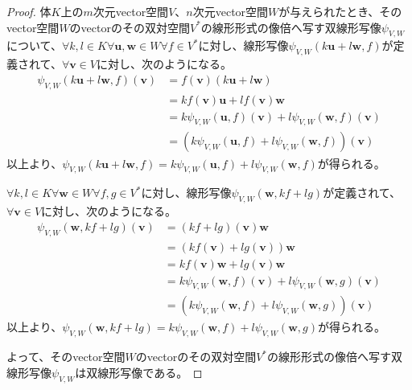 \documentclass[dvipdfmx]{jsarticle}
\begin{document}
\begin{proof}
体$K$上の$m$次元vector空間$V$、$n$次元vector空間$W$が与えられたとき、そのvector空間$W$のvectorのその双対空間$V^{*}$の線形形式の像倍へ写す双線形写像$\psi_{V,W}$について、$\forall k,l \in K\forall\mathbf{u},\mathbf{w} \in W\forall f \in V^{*}$に対し、線形写像$\psi_{V,W}\left( k\mathbf{u} + l\mathbf{w},f \right)$が定義されて、$\forall\mathbf{v} \in V$に対し、次のようになる。
\begin{align*}
\psi_{V,W}\left( k\mathbf{u} + l\mathbf{w},f \right)\left( \mathbf{v} \right) &= f\left( \mathbf{v} \right)\left( k\mathbf{u} + l\mathbf{w} \right)\\
&= kf\left( \mathbf{v} \right)\mathbf{u} + lf\left( \mathbf{v} \right)\mathbf{w}\\
& = k\psi_{V,W}\left( \mathbf{u},f \right)\left( \mathbf{v} \right) + l\psi_{V,W}\left( \mathbf{w},f \right)\left( \mathbf{v} \right)\\
& = \left( k\psi_{V,W}\left( \mathbf{u},f \right) + l\psi_{V,W}\left( \mathbf{w},f \right) \right)\left( \mathbf{v} \right)
\end{align*}
以上より、$\psi_{V,W}\left( k\mathbf{u} + l\mathbf{w},f \right) = k\psi_{V,W}\left( \mathbf{u},f \right) + l\psi_{V,W}\left( \mathbf{w},f \right)$が得られる。\par
$\forall k,l \in K\forall\mathbf{w} \in W\forall f,g \in V^{*}$に対し、線形写像$\psi_{V,W}\left( \mathbf{w},kf + lg \right)$が定義されて、$\forall\mathbf{v} \in V$に対し、次のようになる。
\begin{align*}
\psi_{V,W}\left( \mathbf{w},kf + lg \right)\left( \mathbf{v} \right) &= (kf + lg)\left( \mathbf{v} \right)\mathbf{w}\\
&= \left( kf\left( \mathbf{v} \right) + lg\left( \mathbf{v} \right) \right)\mathbf{w}\\
&= kf\left( \mathbf{v} \right)\mathbf{w} + lg\left( \mathbf{v} \right)\mathbf{w}\\
&= k\psi_{V,W}\left( \mathbf{w},f \right)\left( \mathbf{v} \right) + l\psi_{V,W}\left( \mathbf{w},g \right)\left( \mathbf{v} \right)\\
&= \left( k\psi_{V,W}\left( \mathbf{w},f \right) + l\psi_{V,W}\left( \mathbf{w},g \right) \right)\left( \mathbf{v} \right)
\end{align*}
以上より、$\psi_{V,W}\left( \mathbf{w},kf + lg \right) = k\psi_{V,W}\left( \mathbf{w},f \right) + l\psi_{V,W}\left( \mathbf{w},g \right)$が得られる。\par
よって、そのvector空間$W$のvectorのその双対空間$V^{*}$の線形形式の像倍へ写す双線形写像$\psi_{V,W}$は双線形写像である。
\end{proof}
\end{document}
